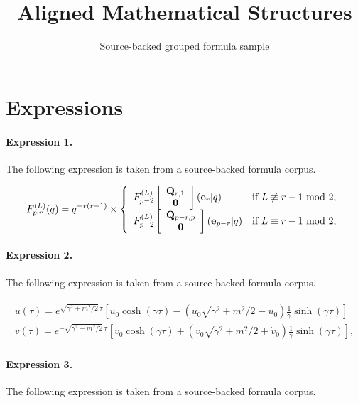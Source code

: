 \documentclass[11pt]{article}
\title{Aligned Mathematical Structures}
\author{Source-backed grouped formula sample}
\date{}
\begin{document}
\maketitle
\section{Expressions}
\paragraph{Expression 1.} The following expression is taken from a source-backed formula corpus.

\begin{align*}F^{(L)}_{p;r}(q) =q^{-r(r-1)} \times\left\{ \begin{array}{ll}F^{(L)}_{p-2} \left[ \begin{array}{c}{\bf Q}_{r,1} \\ {\bf 0} \end{array} \right]({\bf e}_r | q) &\mbox {if $L \not\equiv r-1$ mod $2$}, \\F^{(L)}_{p-2} \left[ \begin{array}{c}{\bf Q}_{p-r,p} \\ {\bf 0} \end{array} \right]({\bf e}_{p-r} | q) &\text{if $L \equiv r-1$ mod $2$},\end{array}\right.\end{align*}

\paragraph{Expression 2.} The following expression is taken from a source-backed formula corpus.

\begin{align*}\begin{array}{c}u(\tau )=e^{\sqrt{\gamma ^2+m^2/2}\,\tau }\left[ u_0\cosh (\gamma \tau)-\left( u_0\sqrt{\gamma ^2+m^2/2}-\dot u_0\right) \frac 1\gamma \sinh(\gamma \tau )\right] \\v(\tau )=e^{-\sqrt{\gamma ^2+m^2/2}\,\tau }\left[ v_0\cosh (\gamma \tau)+\left( v_0\sqrt{\gamma ^2+m^2/2}+\dot v_0\right) \frac 1\gamma \sinh(\gamma \tau )\right] ,\end{array}\end{align*}

\paragraph{Expression 3.} The following expression is taken from a source-backed formula corpus.
\end{document}
